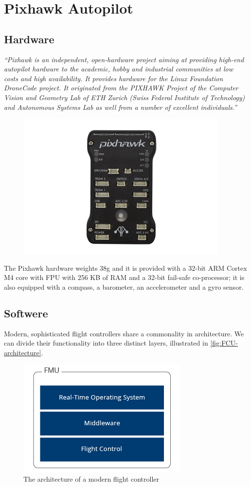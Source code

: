 
\chapter{Pixhawk Autopilot} %
\label{appendix:pixhawk_flight_controller}
\section{Hardware} %
\label{sub:hardware}
\textit{“Pixhawk is an independent, open-hardware project aiming at providing high-end autopilot hardware to the academic, hobby and industrial communities at low costs and high availability. It provides hardware for the Linux Foundation DroneCode project. It originated from the PIXHAWK Project of the Computer Vision and Geometry Lab of ETH Zurich (Swiss Federal Institute of Technology) and Autonomous Systems Lab as well from a number of excellent individuals.”} \cite{Pixhawk}
\begin{figure}[ht]
    \centering
    \includegraphics[width=.6\textwidth]{figures/A1/pixhawk.jpg}
    \caption{}
    \label{fig:Pixhawk Flight Controller}
\end{figure}

The Pixhawk hardware weights 38g and it is provided with a 32-bit ARM Cortex M4 core with FPU with 256 KB of RAM and a 32-bit fail-safe co-processor; it is also equipped with a compass, a barometer, an accelerometer and a gyro sensor. 

\section{Softwere} %
\label{sub:softwere}
Modern, sophisticated flight controllers share a commonality in architecture. We can divide their functionality into three distinct layers, illustrated in \autoref{fig:FCU-architecture}.
\begin{figure}[ht]
    \centering
    \includegraphics[width=.5\textwidth]{figures/A1/flightControllerArchitecture.png}
    \caption{The architecture of a modern flight controller}
    \label{fig:FCU-architecture}
\end{figure}
